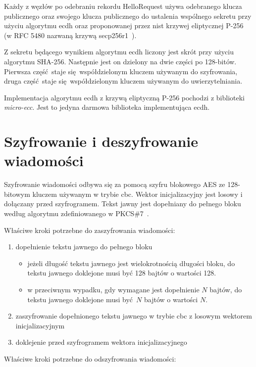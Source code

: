 Każdy z węzłów po odebraniu rekordu HelloRequest używa odebranego klucza publicznego oraz swojego klucza publicznego do ustalenia wspólnego sekretu przy użyciu algorytmu \gls{ecdh} oraz proponowanej przez \gls{nist} krzywej eliptycznej P-256~\cite{kerry2013digital} (w RFC 5480 nazwaną krzywą secp256r1~\cite{turner2009elliptic}).

Z sekretu będącego wynikiem algorytmu \gls{ecdh} liczony jest skrót przy użyciu algorytmu SHA-256. Następnie jest on dzielony na dwie części po 128-bitów. Pierwsza część staje się współdzielonym kluczem używanym do szyfrowania, druga część staje się współdzielonym kluczem używanym do uwierzytelniania.

Implementacja algorytmu \gls{ecdh} z krzywą eliptyczną P-256 pochodzi z biblioteki \emph{micro-ecc}. Jest to jedyna darmowa biblioteka implementująca \gls{ecdh}.

\section{Szyfrowanie i deszyfrowanie wiadomości}
\label{sec:encrypt}

Szyfrowanie wiadomości odbywa się za pomocą szyfru blokowego AES ze 128-bitowym kluczem używanym w trybie \gls{cbc}. Wektor inicjalizacyjny jest losowy i dołączany przed szyfrogramem. Tekst jawny jest dopełniany do pełnego bloku według algorytmu zdefiniowanego w PKCS\#7~\cite{kaliski1998pkcs}.

Właściwe kroki potrzebne do zaszyfrowania wiadomości:

\begin{enumerate}
\item dopełnienie tekstu jawnego do pełnego bloku
\begin{itemize} 
\item jeżeli długość tekstu jawnego jest wielokrotnością długości bloku, do tekstu jawnego doklejone musi być 128 bajtów o wartości 128.
\item w przeciwnym wypadku, gdy wymagane jest dopełnienie $ N $ bajtów, do tekstu jawnego doklejone musi być $ N $ bajtów o wartości $ N $.
\end{itemize}
\item zaszyfrowanie dopełnionego tekstu jawnego w trybie \gls{cbc} z losowym wektorem inicjalizacyjnym
\item doklejenie przed szyfrogramem wektora inicjalizacyjnego
\end{enumerate}

Właściwe kroki potrzebne do odszyfrowania wiadomości:

